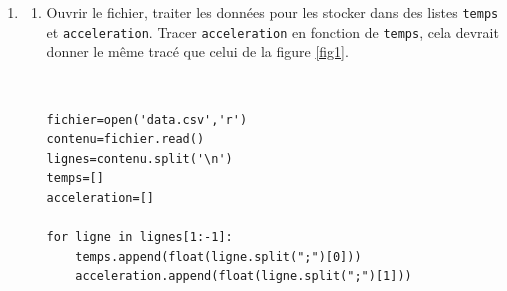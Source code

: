 \documentclass[a4paper,12pt]{article}
\begin{document}
\begin{enumerate}
\item \begin{enumerate}
\item Ouvrir le fichier, traiter les données pour les stocker dans des listes \verb?temps? et \verb?acceleration?. Tracer \verb?acceleration? en fonction de \verb?temps?, cela devrait donner le même tracé que celui de la figure \ref{fig1}.
\begin{solution}~\ \\
\begin{verbatim}
fichier=open('data.csv','r')
contenu=fichier.read()
lignes=contenu.split('\n')
temps=[]
acceleration=[]

for ligne in lignes[1:-1]:
    temps.append(float(ligne.split(";")[0]))
    acceleration.append(float(ligne.split(";")[1]))
    

\end{verbatim}
\end{solution}
\end{enumerate}
\end{enumerate}
\end{document}
